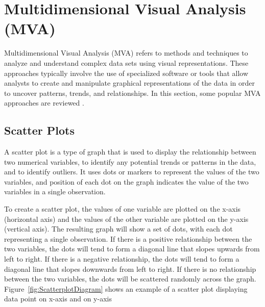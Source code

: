 
\chapter{Multidimensional Visual Analysis (MVA)}

\label{chap:MVA}

Multidimensional Visual Analysis (MVA) refers to methods and
techniques to analyze and understand complex data sets using visual
representations. These approaches typically involve the use of
specialized software or tools that allow analysts to create and
manipulate graphical representations of the data in order to uncover
patterns, trends, and relationships. In this section, some popular MVA
approaches are reviewed \parencite{cao2011mva}.



\section{Scatter Plots}

A scatter plot is a type of graph that is used to display the
relationship between two numerical variables, to identify any
potential trends or patterns in the data, and to identify outliers. It
uses dots or markers to represent the values of the two variables, and
position of each dot on the graph indicates the value of the two
variables in a single observation.

To create a scatter plot, the values of one variable are plotted on the
x-axis (horizontal axis) and the values of the other variable are plotted
on the y-axis (vertical axis). The resulting graph will show a set of
dots, with each dot representing a single observation. If there is a
positive relationship between the two variables, the dots will tend to
form a diagonal line that slopes upwards from left to right. If there is a
negative relationship, the dots will tend to form a diagonal line that
slopes downwards from left to right. If there is no relationship between
the two variables, the dots will be scattered randomly across the graph.
Figure~\ref{fig:ScatterplotDiagram} shows an example of a scatter plot
displaying data point on x-axis and on y-axis


